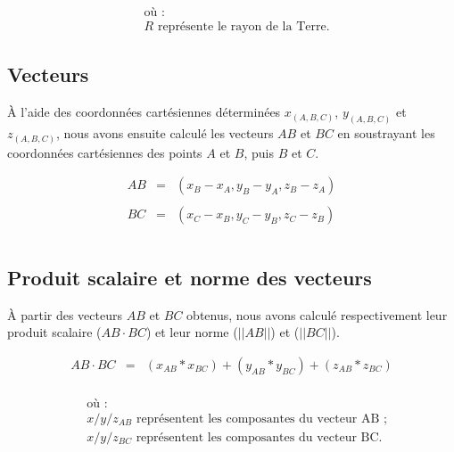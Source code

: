     \begin{align*}
    &\text{où~:} \\
    &R \text{ représente le rayon de la Terre.}
    \end{align*}

\subsection{Vecteurs}
    \label{annexes:calcul-detours-angles-vecteurs}

À l'aide des coordonnées cartésiennes déterminées \(x_{(A, B, C)}\), \(y_{(A, B, C)}\) et \(z_{(A, B, C)}\), nous avons ensuite calculé les vecteurs \(AB\) et \(BC\) en soustrayant les coordonnées cartésiennes des points \(A\) et \(B\), puis \(B\) et \(C\).%

    \begin{equation*}
    \begin{array}{lclclclclcl}
    \displaystyle AB &=& (x_B - x_A, y_B - y_A, z_B - z_A)\\\\
    \displaystyle BC &=& (x_C - x_B, y_C - y_B, z_C - z_B)\\\\
    \end{array}
    \end{equation*}

\subsection{Produit scalaire et norme des vecteurs}
    \label{annexes:calcul-detours-angles-produit-scalaire}

À partir des vecteurs \(AB\) et \(BC\) obtenus, nous avons calculé respectivement leur produit scalaire (\(AB \cdot BC\)) et leur norme (\(||{AB}||\)) et (\(||{BC}||\)).%

    \begin{equation*}
    \begin{array}{lclclclclcl}
    \displaystyle AB \cdot BC &=& (x_{AB} * x_{BC}) + (y_{AB} * y_{BC}) + (z_{AB} * z_{BC})\\
    \end{array}
    \end{equation*}

    \begin{align*}
    &\text{où~:} \\
    &x/y/z_{AB} \text{ représentent les composantes du vecteur AB ;}\\
    &x/y/z_{BC} \text{ représentent les composantes du vecteur BC.}
    \end{align*}

